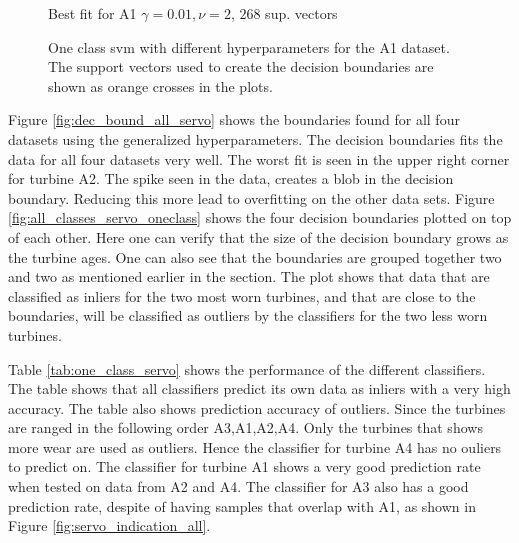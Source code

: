 \begin{figure}[]
\begin{minipage}[b]{0.5\linewidth}
                    \caption*{Best fit for A1 $\gamma = 0.01, \nu = 2$, $268$ sup. vectors}
                \end{minipage}
                \hfill
                \caption{One class svm with different hyperparameters for the A1 dataset. The support vectors used to create the decision boundaries are shown as orange crosses in the plots.}
                \label{fig:hyperparam_oneclass}
            \end{figure}
            
            
            Figure \ref{fig:dec_bound_all_servo} shows the boundaries found for all four datasets using the generalized hyperparameters. The decision boundaries fits the data for all four datasets very well. The worst fit is seen in the upper right corner for turbine A2. The spike seen in the data, creates a blob in the decision boundary. Reducing this more lead to overfitting on the other data sets. Figure \ref{fig:all_classes_servo_oneclass} shows the four decision boundaries plotted on top of each other. Here one can verify that the size of the decision boundary grows as the turbine ages. One can also see that the boundaries are grouped together two and two as mentioned earlier in the section. The plot shows that data that are classified as inliers for the two most worn turbines, and that are close to the boundaries, will be classified as outliers by the classifiers for the two less worn turbines. 
            
            Table \ref{tab:one_class_servo} shows the performance of the different classifiers. The table shows that all classifiers predict its own data as inliers with a very high accuracy. The table also shows prediction accuracy of outliers. Since the turbines are ranged in the following order A3,A1,A2,A4. Only the turbines that shows more wear are used as outliers. Hence the classifier for turbine A4 has no ouliers to predict on. The classifier for turbine A1 shows a very good prediction rate when tested on data from A2 and A4. The classifier for A3 also has a good prediction rate, despite of having samples that overlap with A1, as shown in Figure \ref{fig:servo_indication_all}.  

